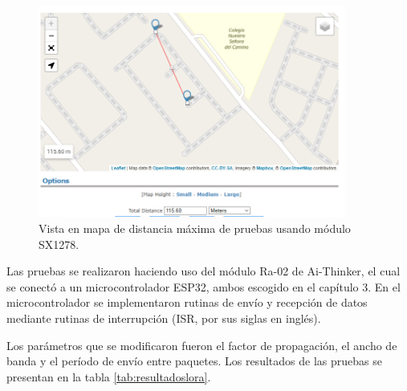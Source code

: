 \begin{figure}[H]
    \centering
    \includegraphics[width = 0.9\textwidth]{imagenes/cap3_resultados/Pruebas LoRa/MapaLora.png}
    \caption{Vista en mapa de distancia máxima de pruebas usando módulo SX1278.}
    \label{fig:mapalora}
\end{figure}

Las pruebas se realizaron haciendo uso del módulo Ra-02 de Ai-Thinker, el cual se conectó a un microcontrolador ESP32, ambos escogido en el capítulo 3. En el microcontrolador se implementaron rutinas de envío y recepción de datos mediante rutinas de interrupción (ISR, por sus siglas en inglés).


Los parámetros que se modificaron fueron el factor de propagación, el ancho de banda y el período de envío entre paquetes. Los resultados de las pruebas se presentan en la tabla \ref{tab:resultadoslora}.

